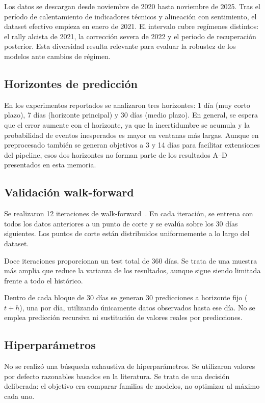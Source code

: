 Los datos se descargan desde noviembre de 2020 hasta noviembre de 2025. Tras el período de calentamiento de indicadores técnicos y alineación con sentimiento, el dataset efectivo empieza en enero de 2021. El intervalo cubre regímenes distintos: el rally alcista de 2021, la corrección severa de 2022 y el periodo de recuperación posterior. Esta diversidad resulta relevante para evaluar la robustez de los modelos ante cambios de régimen.

\subsection{Horizontes de predicción}

En los experimentos reportados se analizaron tres horizontes: 1 día (muy corto plazo), 7 días (horizonte principal) y 30 días (medio plazo). En general, se espera que el error aumente con el horizonte, ya que la incertidumbre se acumula y la probabilidad de eventos inesperados es mayor en ventanas más largas. Aunque en preprocesado también se generan objetivos a 3 y 14 días para facilitar extensiones del pipeline, esos dos horizontes no forman parte de los resultados A--D presentados en esta memoria.

\subsection{Validación walk-forward}

Se realizaron 12 iteraciones de walk-forward~\cite{hyndman2021forecasting}. En cada iteración, se entrena con todos los datos anteriores a un punto de corte y se evalúa sobre los 30 días siguientes. Los puntos de corte están distribuidos uniformemente a lo largo del dataset.

Doce iteraciones proporcionan un test total de 360 días. Se trata de una muestra más amplia que reduce la varianza de los resultados, aunque sigue siendo limitada frente a todo el histórico.

Dentro de cada bloque de 30 días se generan 30 predicciones a horizonte fijo ($t+h$), una por día, utilizando únicamente datos observados hasta ese día. No se emplea predicción recursiva ni sustitución de valores reales por predicciones.

\subsection{Hiperparámetros}

No se realizó una búsqueda exhaustiva de hiperparámetros. Se utilizaron valores por defecto razonables basados en la literatura. Se trata de una decisión deliberada: el objetivo era comparar familias de modelos, no optimizar al máximo cada uno.


